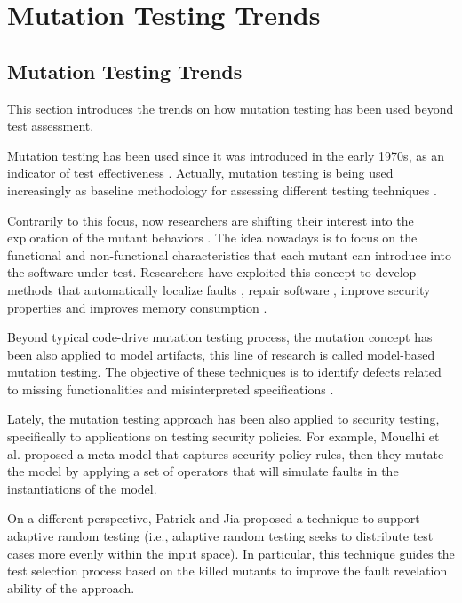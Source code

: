 
\chapter{Mutation Testing Trends}
\label{chapter:trends}


\section{Mutation Testing Trends}

This section introduces the trends on how mutation testing has been used beyond test assessment.

Mutation testing has been used since it was introduced in the early 1970s, as an indicator of test effectiveness \cite{DeMillo78}. Actually, mutation testing is being used increasingly as baseline methodology for assessing different testing techniques \cite{chekam2017empirical}.

Contrarily to this focus, now researchers are shifting their interest into the exploration of the mutant behaviors \cite{papadakis2019mutation}. The idea nowadays is to focus on the functional and non-functional characteristics that each mutant can introduce into the software under test.
Researchers have exploited this concept to develop methods that automatically localize faults \cite{papadakis2015metallaxis}, repair software \cite{le2011genprog}, improve security properties \cite{loise2017towards} and improves memory consumption \cite{langdon2017genetic}.


Beyond typical code-drive mutation testing process, the mutation concept has been also applied to model artifacts, this line of research is called model-based mutation testing. The objective of these techniques is to identify defects related to missing functionalities and misinterpreted specifications \cite{devroey2016featured,belli2016model}.

Lately, the mutation testing approach has been also applied to security testing, specifically to applications on testing security policies. For example, Mouelhi et al. \cite{mouelhiv2008generic} proposed a meta-model that captures security policy rules, then they mutate the model by applying a set of operators that will simulate faults in the instantiations of the model. 

On a different perspective, Patrick and Jia \cite{patrick2015kernel} proposed a technique to support adaptive random testing (i.e., adaptive random testing seeks to distribute test cases more evenly within the input space). In particular, this technique guides the test selection process based on the killed mutants to improve the fault revelation ability of the approach.

